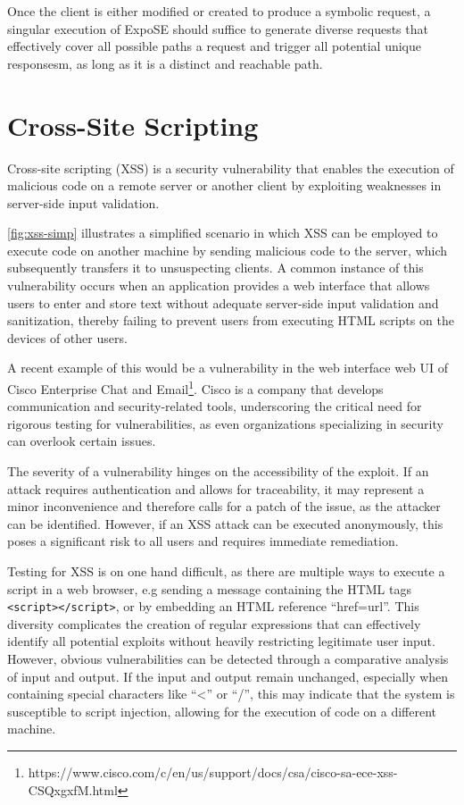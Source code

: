 Once the client is either modified or created to produce a symbolic request, 
a singular execution of ExpoSE should suffice to generate diverse requests that effectively cover all
possible paths a request and trigger all potential unique responsesm, as long as it is a distinct and reachable path.




\section{Cross-Site Scripting}
\label{sec:xss}
Cross-site scripting (XSS) is a security vulnerability that enables the execution of malicious code on a remote server or
another client by exploiting weaknesses in server-side input validation. \cite{bisht_xss-guard_2008}

\autoref{fig:xss-simp} illustrates a simplified scenario in which XSS can be employed to execute code on
another machine by sending malicious code to the server, which subsequently transfers it to unsuspecting clients.
A common instance of this vulnerability occurs when an application provides a web interface that allows users
to enter and store text without adequate server-side input validation and sanitization,
thereby failing to prevent users from executing HTML scripts on the devices of other users.

A recent example of this would be a vulnerability in the web interface web UI of Cisco Enterprise Chat and 
Email\footnote{https://www.cisco.com/c/en/us/support/docs/csa/cisco-sa-ece-xss-CSQxgxfM.html}. 
Cisco is a company that develops communication and security-related tools, 
underscoring the critical need for rigorous testing for vulnerabilities,
as even organizations specializing in security can overlook certain issues.

The severity of a vulnerability hinges on the accessibility of the exploit. 
If an attack requires authentication and allows for traceability,
it may represent a minor inconvenience and therefore calls for a patch of the issue,
as the attacker can be identified. However, if an XSS attack can be executed anonymously,
this poses a significant risk to all users and requires immediate remediation.

Testing for XSS is on one hand difficult, as there are multiple ways to execute a script in a web browser,
e.g sending a message containing the HTML tags \lstinline{<script></script>}, 
or by embedding an HTML reference “href=url”. 
This diversity complicates the creation of regular expressions that can effectively identify 
all potential exploits without heavily restricting legitimate user input.
However, obvious vulnerabilities can be detected through a comparative analysis of input and output.
If the input and output remain unchanged, especially when containing special characters like “\textless” or “/”,
this may indicate that the system is susceptible to script injection, allowing for the execution of code on a different machine.

